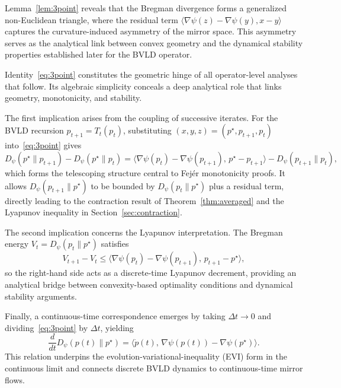 \documentclass[11pt]{article}
\newcommand{\inner}[2]{\langle #1 , #2 \rangle}
\theoremstyle{plain}
\theoremstyle{definition}
\theoremstyle{remark}
\begin{document}
\noindent
Lemma~\ref{lem:3point} reveals that the Bregman divergence 
forms a generalized non-Euclidean triangle, 
where the residual term 
$\inner{\nabla\psi(z)-\nabla\psi(y)}{x-y}$ 
captures the curvature-induced asymmetry of the mirror space.
This asymmetry serves as the analytical link between 
convex geometry and the dynamical stability properties 
established later for the BVLD operator.









Identity~\eqref{eq:3point} constitutes the geometric hinge of all 
operator-level analyses that follow.  
Its algebraic simplicity conceals a deep analytical role that links geometry, 
monotonicity, and stability.

The first implication arises from the coupling of successive iterates.  
For the BVLD recursion $p_{t+1}=T_t(p_t)$, substituting 
$(x,y,z)=(p^\star,p_{t+1},p_t)$ into~\eqref{eq:3point} gives
\[
D_\psi(p^\star\|p_{t+1})-D_\psi(p^\star\|p_t)
=\langle\nabla\psi(p_t)-\nabla\psi(p_{t+1}),\,p^\star-p_{t+1}\rangle
-D_\psi(p_{t+1}\|p_t),
\]
which forms the telescoping structure central to Fejér monotonicity proofs.  
It allows $D_\psi(p_{t+1}\|p^\star)$ to be bounded by 
$D_\psi(p_t\|p^\star)$ plus a residual term, 
directly leading to the contraction result of 
Theorem~\ref{thm:averaged} and the Lyapunov inequality 
in Section~\ref{sec:contraction}.

The second implication concerns the Lyapunov interpretation.  
The Bregman energy $V_t=D_\psi(p_t\|p^\star)$ satisfies
\[
V_{t+1}-V_t\le 
\langle\nabla\psi(p_t)-\nabla\psi(p_{t+1}),\,p_{t+1}-p^\star\rangle,
\]
so the right-hand side acts as a discrete-time Lyapunov decrement, 
providing an analytical bridge between convexity-based optimality 
conditions and dynamical stability arguments.

Finally, a continuous-time correspondence emerges by taking 
$\Delta t\!\to\!0$ and dividing~\eqref{eq:3point} by $\Delta t$, yielding
\[
\frac{d}{dt}D_\psi(p(t)\|p^\star)
=\langle\dot p(t),\,\nabla\psi(p(t))-\nabla\psi(p^\star)\rangle.
\]
This relation underpins the evolution-variational-inequality (EVI) 
form in the continuous limit and connects discrete BVLD dynamics 
to continuous-time mirror flows.
\end{document}
